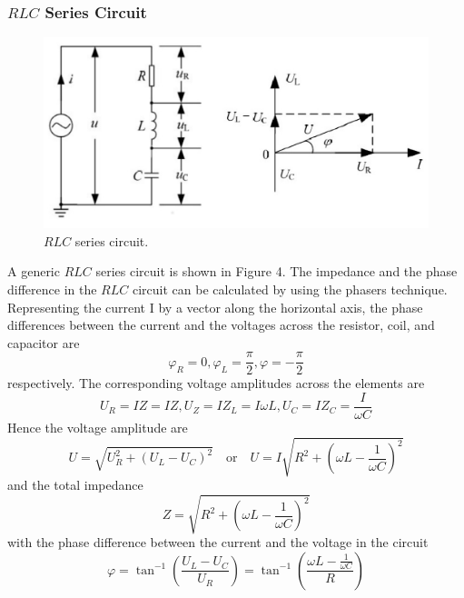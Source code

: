 \documentclass[12pt]{article}
\begin{document}
\subsubsection{$RLC$ Series Circuit}
\begin{figure}[H]
\centering
\includegraphics[scale=0.4]{P4.jpg}
\caption{$RLC$ series circuit.}
\end{figure}
A generic $RLC$ series circuit is shown in Figure 4. The impedance and the phase difference in the $RLC$ circuit can be calculated by using the phasers technique. Representing the current I by a vector along the horizontal axis, the phase differences between the current and the voltages across the resistor, coil, and capacitor are
$$\varphi_R=0,\varphi_L=\frac{\pi}{2},\varphi=-\frac{\pi}{2}$$
respectively. The corresponding voltage amplitudes across the elements are
$$U_R=IZ=IZ,U_Z=IZ_L=I\omega L,U_C=IZ_C=\frac{I}{\omega C}$$
Hence the voltage amplitude are 
\begin{equation}
U=\sqrt{U_R^2+(U_L-U_C)^2}\quad\mathrm{or}\quad U=I\sqrt{R^2+(\omega L-\frac{1}{\omega C})^2}
\end{equation}
and the total impedance
\begin{equation}
Z=\sqrt{R^2+(\omega L-\frac{1}{\omega C})^2}
\end{equation}
with the phase difference between the current and the voltage in the circuit
$$\varphi=\tan^{-1}(\frac{U_L-U_C}{U_R})=\tan^{-1}(\frac{\omega L-\frac{1}{\omega C}}{R})$$
\end{document}
